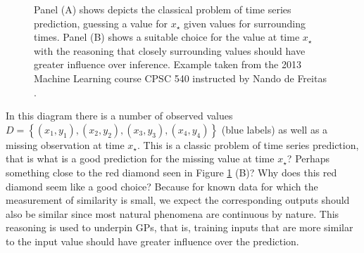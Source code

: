 \begin{figure}[h]
{\begin{adjustbox}{width=0.48\textwidth}
        \end{adjustbox}
    }
    \caption{Panel (A) shows depicts the classical problem of time series prediction, guessing a value for $x_{\star}$ given values for surrounding times. Panel (B) shows a suitable choice for the value at time $x_{\star}$ with the reasoning that closely surrounding values should have greater influence over inference. Example taken from the 2013 Machine Learning course CPSC 540 instructed by Nando de Freitas \cite{Nando2013}.}
    \label{fig: motive_gp_1}
\end{figure}

In this diagram there is a number of observed values $D = \left\{ (x_1,y_1), (x_2,y_2), (x_3,y_3), (x_4,y_4) \right\}$ (blue labels) as well as a missing observation at time $x_{\star}$. This is a classic problem of time series prediction, that is what is a good prediction for the missing value at time $x_{\star}$? Perhaps something close to the red diamond seen in Figure \ref{fig: motive_gp_1} (B)? Why does this red diamond seem like a good choice? Because for known data for which the measurement of similarity is small, we expect the corresponding outputs should also be similar since most natural phenomena are continuous by nature. This reasoning is used to underpin GPs, that is, training inputs that are more similar to the input value should have greater influence over the prediction.

